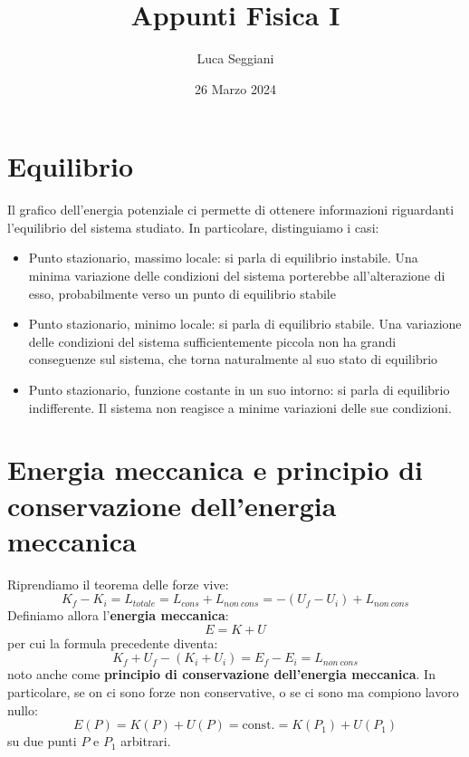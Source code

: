 \documentclass[a4paper,12pt]{article}
\title{Appunti Fisica I}
\author{Luca Seggiani}
\date{26 Marzo 2024}
\begin{document}
\maketitle
\section{Equilibrio}
Il grafico dell'energia potenziale ci permette di ottenere informazioni riguardanti l'equilibrio del sistema studiato. In particolare, distinguiamo i casi:
\begin{itemize}
  \item Punto stazionario, massimo locale: si parla di equilibrio instabile. Una minima variazione delle condizioni
    del sistema porterebbe all'alterazione di esso, probabilmente verso un punto di equilibrio stabile
  \item Punto stazionario, minimo locale: si parla di equilibrio stabile. Una variazione delle condizioni
    del sistema sufficientemente piccola non ha grandi conseguenze sul sistema, che torna naturalmente al suo stato 
    di equilibrio
  \item Punto stazionario, funzione costante in un suo intorno: si parla di equilibrio indifferente. Il sistema
    non reagisce a minime variazioni delle sue condizioni.
\end{itemize}
\section{Energia meccanica e principio di conservazione dell'energia meccanica}
Riprendiamo il teorema delle forze vive:
$$ K_f - K_i = L_{totale} = L_{cons} + L_{non \ cons} = -(U_f - U_i) + L_{non \ cons}$$
Definiamo allora l'\textbf{energia meccanica}:
$$ E = K + U $$
per cui la formula precedente diventa:
$$ K_f + U_f - (K_i + U_i) = E_f - E_i = L_{non \ cons} $$
noto anche come \textbf{principio di conservazione dell'energia meccanica}. In particolare, se on ci sono forze
non conservative, o se ci sono ma compiono lavoro nullo:
$$ E(P) = K(P) + U(P) = \mathrm{const.} = K(P_1) + U(P_1) $$
su due punti $P$ e $P_1$ arbitrari.
\end{document}
